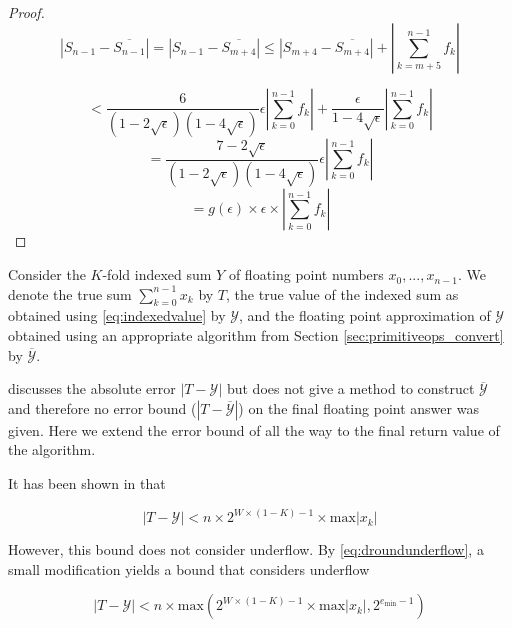 \documentclass[12pt]{article}
\providecommand{\min}{\ensuremath{\text{min}}}
\providecommand{\max}{\ensuremath{\text{max}}}
\theoremstyle{definition}
\numberwithin{equation}{section}
\numberwithin{figure}{section}
\begin{document}
\begin{proof}
        \begin{equation*}
          |S_{n - 1} - \overline{S_{n - 1}}| = |S_{n - 1} - \overline{S_{m + 4}}| \leq |S_{m + 4} - \overline{S_{m + 4}}| + |\sum\limits_{k = m + 5}^{n - 1}f_k|
        \end{equation*}

        \begin{equation*}
          < \frac{6}{(1 - 2\sqrt\epsilon)(1 - 4\sqrt\epsilon)}\epsilon|\sum\limits_{k = 0}^{n - 1}f_k| + \frac{\epsilon}{1 - 4\sqrt\epsilon}|\sum\limits_{k = 0}^{n - 1} f_k|
        \end{equation*}
        \begin{equation*}
          = \frac{7 - 2\sqrt\epsilon}{(1 - 2\sqrt\epsilon)(1 - 4\sqrt\epsilon)}\epsilon|\sum\limits_{k = 0}^{n - 1}f_k|
        \end{equation*}
        \begin{equation*}
          = g(\epsilon)\times \epsilon\times |\sum\limits_{k = 0}^{n - 1}f_k|
        \end{equation*}
    \end{proof}

    Consider the $K$-fold indexed sum $Y$ of floating point numbers $x_0, ..., x_{n - 1}$. We denote the true sum $\sum \limits_{k = 0}^{n - 1} x_k$ by $T$, the true value of the indexed sum as obtained using  \eqref{eq:indexedvalue} by $\mathcal{Y}$, and the floating point approximation of $\mathcal{Y}$ obtained using an appropriate algorithm from Section \ref{sec:primitiveops_convert} by $\overline{\mathcal{Y}}$.

    \cite{repsum} discusses the absolute error $|T - \mathcal{Y}|$ but does not give a method to construct $\overline{\mathcal{Y}}$ and therefore no error bound ($|T - \overline{\mathcal{Y}}|$) on the final floating point answer was given. Here we extend the error bound of \cite{repsum} all the way to the final return value of the algorithm.

    It has been shown in \cite{repsum} that

    \begin{equation}
      \label{eq:repboundnaive}
      |T - \mathcal{Y}| < n \times 2^{W \times (1 - K) - 1} \times \max|x_k|
    \end{equation}

    However, this bound does not consider underflow. By  \eqref{eq:droundunderflow}, a small modification yields a bound that considers underflow

    \begin{equation}
      \label{eq:repbound}
      |T - \mathcal{Y}| < n \times \max(2^{W \times (1 - K) - 1} \times \max|x_k|, 2^{e_{\min} - 1})
    \end{equation}
\end{document}

